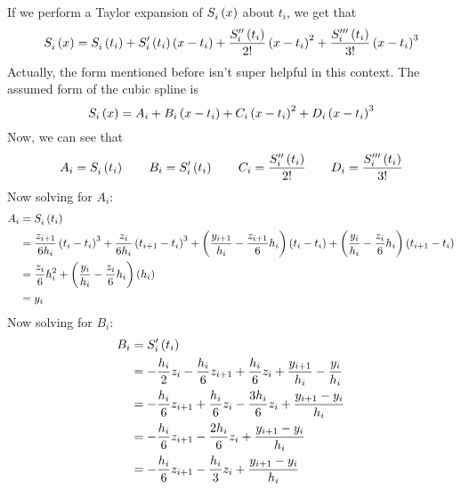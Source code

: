 \documentclass[letterpaper, 10pt, titlepage]{article}
\newcommand{\pp}{\paren}
\newcommand{\primed}[1]{^{
    \ifthenelse
    {
        \equal{#1}{0}
    }
    {
    }
    {
        \foreach \x in {1,...,#1}{\prime}}
    }
}
\newcommand{\fs}[3]{\functionof{S_{#1}\primed{#2}}{#3}}
\begin{document}
If we perform a Taylor expansion of $\fs{i}{0}{x}$ about $t_i$, we get that
\begin{equation}
    \fs{i}{0}{x} = \fs{i}{0}{t_i} + \fs{i}{1}{t_i}\pp{x - t_i}
    + \dfrac{\fs{i}{2}{t_i}}{2!}\pp{x - t_i}^2
    + \dfrac{\fs{i}{3}{t_i}}{3!}\pp{x - t_i}^3
\end{equation}
Actually, the form mentioned before isn't super helpful in this context.
The assumed form of the cubic spline is
\begin{equation}
    \functionof{S_i}{x} =
    A_i + B_i\pp{x - t_i} + C_i\pp{x - t_i}^2 + D_i\pp{x - t_i}^3
\end{equation}
Now, we can see that
\begin{equation}
        A_i = \fs{i}{0}{t_i}
        \quad\quad
        B_i = \fs{i}{1}{t_i}
        \quad\quad
        C_i = \dfrac{\fs{i}{2}{t_i}}{2!}
        \quad\quad
        D_i = \dfrac{\fs{i}{3}{t_i}}{3!}
\end{equation}
Now solving for $A_i$:
\begin{equation}
    \begin{aligned}
        A_i &= \fs{i}{0}{t_i}\\
        &=
        \dfrac{z_{i+1}}{6h_i}\pp{t_i - t_i}^3
        + \dfrac{z_{i}}{6h_i}\pp{t_{i+1} - t_i}^3
        + \pp{
            \dfrac{y_{i+1}}{h_i}
            - \dfrac{z_{i+1}}{6}h_i
            }\pp{t_i - t_i}
        + \pp{\dfrac{y_i}{h_i}
        - \dfrac{z_{i}}{6}h_i}\pp{t_{i+1} - t_i}
        \\
        &=
        \dfrac{z_{i}}{6}h_i^2
        + \pp{\dfrac{y_i}{h_i}
        - \dfrac{z_{i}}{6}h_i}\pp{h_i}
        \\
        &=
        y_i
    \end{aligned}
\end{equation}
Now solving for $B_i$:
\begin{equation}
    \begin{aligned}
        B_i &= \fs{i}{1}{t_i}
        \\
        &=
        - \dfrac{h_{i}}{2}z_i
        - \dfrac{h_{i}}{6}z_{i+1}
        + \dfrac{h_{i}}{6}z_i
        + \dfrac{y_{i+1}}{h_i}
        - \dfrac{y_i}{h_i}
        \\
        &=
        - \dfrac{h_{i}}{6}z_{i+1}
        + \dfrac{h_{i}}{6}z_i
        - \dfrac{3h_{i}}{6}z_i
        + \dfrac{y_{i+1} - y_i}{h_i}
        \\
        &=
        - \dfrac{h_{i}}{6}z_{i+1}
        - \dfrac{2h_{i}}{6}z_i
        + \dfrac{y_{i+1} - y_i}{h_i}
        \\
        &=
        - \dfrac{h_{i}}{6}z_{i+1}
        - \dfrac{h_{i}}{3}z_i
        + \dfrac{y_{i+1} - y_i}{h_i}
    \end{aligned}
\end{equation}
\end{document}
